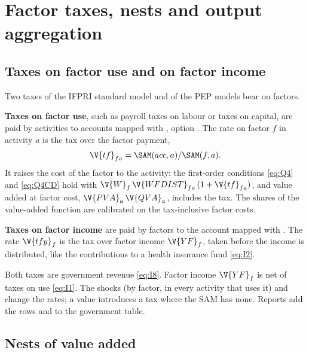 \chapter{Factor taxes, nests and output aggregation}\label{chap:production}

\section{Taxes on factor use and on factor income}\label{sec:factortax}

Two taxes of the IFPRI standard model \citep{lofgren2002} and of the PEP
models \citep{decaluwe2013} bear on factors.

\textbf{Taxes on factor use}, such as payroll taxes on labour or taxes on
capital, are paid by activities to accounts mapped with ,
option \cmd{:}\cmd{)}. The rate on
factor $f$ in activity $a$ is the tax over the factor payment,
\begin{equation*}
\V{tf}_{fa} = \SAM(acc, a) / \SAM(f, a).
\end{equation*}
It raises the cost of the factor to the activity: the first-order conditions
\eqref{eq:Q4} and \eqref{eq:Q4CD} hold with
$\V{W}_f\,\V{WFDIST}_{fa}\,(1 + \V{tf}_{fa})$, and value added at factor cost,
$\V{PVA}_a\,\V{QVA}_a$, includes the tax. The shares of the value-added
function are calibrated on the tax-inclusive factor costs.

\textbf{Taxes on factor income} are paid by factors to the account mapped with
\cmd{)}. The rate $\V{tfy}_f$ is the tax
over factor income $\V{YF}_f$, taken before the income is distributed, like
the contributions to a health insurance fund \eqref{eq:I2}.

Both taxes are government revenue \eqref{eq:I8}. Factor income $\V{YF}_f$ is
net of taxes on use \eqref{eq:I1}. The shocks  (by factor, in every
activity that uses it) and  change the rates; a value introduces a
tax where the SAM has none. Reports add the rows  and
 to the government table.

\section{Nests of value added}\label{sec:nests}

